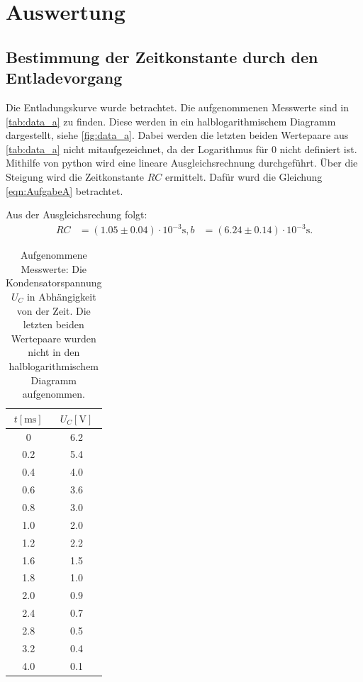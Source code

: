 \section{Auswertung}
\label{sec:Auswertung}

\subsection{Bestimmung der Zeitkonstante durch den Entladevorgang}
\label{subsec:Aufgabe_A}
Die Entladungskurve wurde betrachtet.
Die aufgenommenen Messwerte sind in \autoref{tab:data_a} zu finden.
Diese werden in ein halblogarithmischem Diagramm dargestellt, siehe \autoref{fig:data_a}.
Dabei werden die letzten beiden Wertepaare aus \autoref{tab:data_a} nicht mitaufgezeichnet, da der Logarithmus für 0 nicht definiert ist.
Mithilfe von python wird eine lineare Ausgleichsrechnung durchgeführt.
Über die Steigung wird die Zeitkonstante $RC$ ermittelt.
Dafür wurd die Gleichung \eqref{eqn:AufgabeA} betrachtet.

\noindent
Aus der Ausgleichsrechung folgt:
\begin{align*}
  RC &= (1.05 \pm 0.04) \cdot 10^{-3} \si{\second},
  b  &= (6.24 \pm 0.14) \cdot 10^{-3} \si{\second}.
\end{align*}

\begin{table}
  \centering
  \caption{Aufgenommene Messwerte: Die Kondensatorspannung $U_C$ in Abhängigkeit von der Zeit.
  Die letzten beiden Wertepaare wurden nicht in den halblogarithmischem Diagramm aufgenommen.}
  \label{tab:data_a}
  \begin{tabular}{c c}
    \toprule
    $t [\si{\milli\second}]$ & $U_C [\si{\volt}]$ \\
    \midrule
      0     &     6.2  \\
      0.2   &     5.4  \\
      0.4   &     4.0  \\
      0.6   &     3.6  \\
      0.8   &     3.0  \\
      1.0   &     2.0  \\
      1.2   &     2.2  \\
      1.6   &     1.5  \\
      1.8   &     1.0  \\
      2.0   &     0.9  \\
      2.4   &     0.7  \\
      2.8   &     0.5  \\
      3.2   &     0.4  \\
      4.0   &     0.1  \\
    \bottomrule
  \end{tabular}
\end{table}

